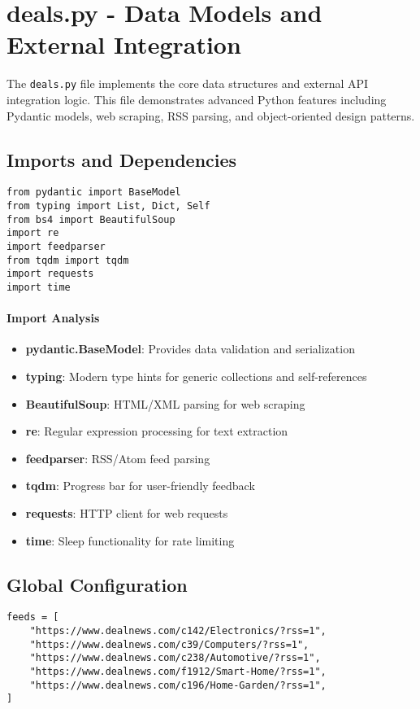 \section{deals.py - Data Models and External Integration}

The \texttt{deals.py} file implements the core data structures and external API integration logic. This file demonstrates advanced Python features including Pydantic models, web scraping, RSS parsing, and object-oriented design patterns.

\subsection{Imports and Dependencies}

\begin{lstlisting}[caption=deals.py - Import Analysis]
from pydantic import BaseModel
from typing import List, Dict, Self
from bs4 import BeautifulSoup
import re
import feedparser
from tqdm import tqdm
import requests
import time
\end{lstlisting}

\paragraph{Import Analysis}
\begin{itemize}
\item \textbf{pydantic.BaseModel}: Provides data validation and serialization
\item \textbf{typing}: Modern type hints for generic collections and self-references
\item \textbf{BeautifulSoup}: HTML/XML parsing for web scraping
\item \textbf{re}: Regular expression processing for text extraction
\item \textbf{feedparser}: RSS/Atom feed parsing
\item \textbf{tqdm}: Progress bar for user-friendly feedback
\item \textbf{requests}: HTTP client for web requests
\item \textbf{time}: Sleep functionality for rate limiting
\end{itemize}

\subsection{Global Configuration}

\begin{lstlisting}[caption=RSS Feed Configuration]
feeds = [
    "https://www.dealnews.com/c142/Electronics/?rss=1",
    "https://www.dealnews.com/c39/Computers/?rss=1", 
    "https://www.dealnews.com/c238/Automotive/?rss=1",
    "https://www.dealnews.com/f1912/Smart-Home/?rss=1",
    "https://www.dealnews.com/c196/Home-Garden/?rss=1",
]
\end{lstlisting}

